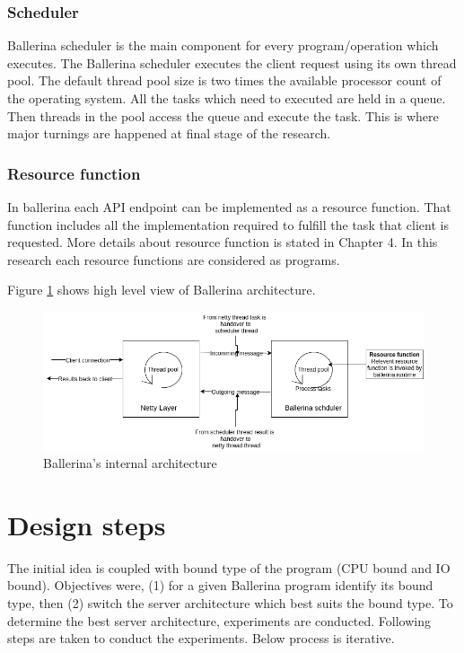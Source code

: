 \subsubsection{Scheduler}

Ballerina scheduler is the main component for every program/operation which executes. The Ballerina scheduler executes the client request using its own thread pool. The default thread pool size is two times the available processor count of the operating system. All the tasks which need to executed are held in a queue. Then threads in the pool access the queue and execute the task. This is where major turnings are happened at final stage of the research. 

\subsubsection{Resource function}

In ballerina each API endpoint can be implemented as a resource function. That function includes all the implementation required to fulfill the task that client is requested. More details about resource function is stated in Chapter 4. In this research each resource functions are considered as programs.


Figure \ref{bal_internal} shows high level view of Ballerina architecture.

\begin{figure}[htbp]
	\begin{center}
		\includegraphics[scale=0.5]{figures/bal-internal.png}
	\end{center}
	\caption{Ballerina's internal architecture}
	\label{bal_internal}
\end{figure}

\section{Design steps}

The initial idea is coupled with bound type of the program (CPU bound and IO bound). Objectives were, (1) for a given Ballerina program identify its bound type, then (2) switch the server architecture which best suits the bound type. To determine the best  server architecture, experiments are conducted. Following steps are taken to conduct the experiments. Below process is iterative.

